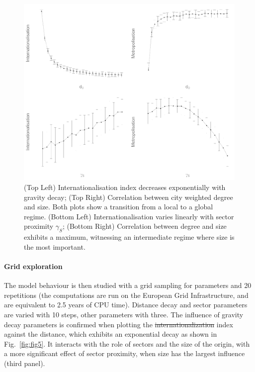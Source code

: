 \documentclass[10pt,letterpaper]{article}
\providecommand{\DIFadd}[1]{{\protect\color{blue}\uwave{#1}}} %
\providecommand{\DIFdel}[1]{{\protect\color{red}\sout{#1}}}                      %
\providecommand{\DIFaddbegin}{} %
\providecommand{\DIFaddend}{} %
\providecommand{\DIFdelbegin}{} %
\providecommand{\DIFdelend}{} %
\providecommand{\DIFaddbeginFL}{} %
\providecommand{\DIFaddendFL}{} %
\begin{document}
\begin{figure}
	\DIFaddbeginFL \begin{center}
	    \includegraphics[width=\linewidth]{figures/Fig4.png}
	\end{center}
	\DIFaddendFL \vspace{2cm}
    \caption{(Top Left) Internationalisation index decreases exponentially with gravity decay; (Top Right) Correlation between city weighted degree and size. Both plots show a transition from a local to a global regime. (Bottom Left) Internationalisation varies linearly with sector proximity $\gamma_S$; (Bottom Right) Correlation between degree and size exhibits a maximum, witnessing an intermediate regime where size is the most important. \label{fig:fig4}}
\end{figure}



\paragraph{Grid exploration}

The model behaviour is then studied with a grid sampling for parameters and 20 repetitions (the computations are run on the European Grid Infrastructure, and are equivalent to 2.5 years of CPU time). Distance decay and sector  parameters are varied with 10 steps, other parameters with three. The influence of gravity decay parameters is confirmed when plotting the \DIFdelbegin \DIFdel{internationalization }\DIFdelend \DIFaddbegin \DIFadd{internationalisation }\DIFaddend index against the distance, which exhibits an exponential decay as shown in Fig.~\ref{fig:fig5}. It interacts with the role of sectors and the size of the origin, with a more significant effect of sector proximity, when size has the largest influence (third panel).
\end{document}
